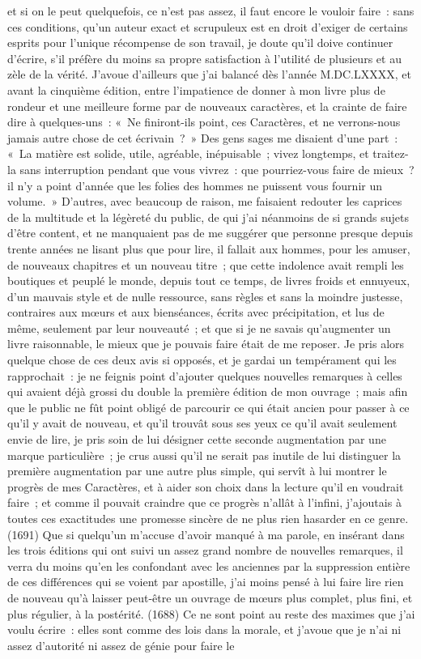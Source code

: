 \documentclass[french,twoside]{book} %
\newcommand{\ed}[1]{ {\color{silver}\sffamily\footnotesize (#1)} } %
\begin{document}
et si on le peut quelquefois, ce n’est pas assez, il faut encore le vouloir faire : sans ces conditions, qu’un auteur exact et scrupuleux est en droit d’exiger de certains esprits pour l’unique récompense de son travail, je doute qu’il doive continuer d’écrire, s’il préfère du moins sa propre satisfaction à l’utilité de plusieurs et au zèle de la vérité. J'avoue d’ailleurs que j’ai balancé dès l’année M.DC.LXXXX, et avant la cinquième édition, entre l’impatience de donner à mon livre plus de rondeur et une meilleure forme par de nouveaux caractères, et la crainte de faire dire à quelques-uns : « Ne finiront-ils point, ces Caractères, et ne verrons-nous jamais autre chose de cet écrivain ? » Des gens sages me disaient d’une part : « La matière est solide, utile, agréable, inépuisable ; vivez longtemps, et traitez-la sans interruption pendant que vous vivrez : que pourriez-vous faire de mieux ? il n’y a point d’année que les folies des hommes ne puissent vous fournir un volume. » D'autres, avec beaucoup de raison, me faisaient redouter les caprices de la multitude et la légèreté du public, de qui j’ai néanmoins de si grands sujets d’être content, et ne manquaient pas de me suggérer que personne presque depuis trente années ne lisant plus que pour lire, il fallait aux hommes, pour les amuser, de nouveaux chapitres et un nouveau titre ; que cette indolence avait rempli les boutiques et peuplé le monde, depuis tout ce temps, de livres froids et ennuyeux, d’un mauvais style et de nulle ressource, sans règles et sans la moindre justesse, contraires aux mœurs et aux bienséances, écrits avec précipitation, et lus de même, seulement par leur nouveauté ; et que si je ne savais qu’augmenter un livre raisonnable, le mieux que je pouvais faire était de me reposer. Je pris alors quelque chose de ces deux avis si opposés, et je gardai un tempérament qui les rapprochait : je ne feignis point d’ajouter quelques nouvelles remarques à celles qui avaient déjà grossi du double la première édition de mon ouvrage ; mais afin que le public ne fût point obligé de parcourir ce qui était ancien pour passer à ce qu’il y avait de nouveau, et qu’il trouvât sous ses yeux ce qu’il avait seulement envie de lire, je pris soin de lui désigner cette seconde augmentation par une marque particulière ; je crus aussi qu’il ne serait pas inutile de lui distinguer la première augmentation par une autre plus simple, qui servît à lui montrer le progrès de mes Caractères, et à aider son choix dans la lecture qu’il en voudrait faire ; et comme il pouvait craindre que ce progrès n’allât à l’infini, j’ajoutais à toutes ces exactitudes une promesse sincère de ne plus rien hasarder en ce genre. \ed{1691}Que si quelqu’un m’accuse d’avoir manqué à ma parole, en insérant dans les trois éditions qui ont suivi un assez grand nombre de nouvelles remarques, il verra du moins qu’en les confondant avec les anciennes par la suppression entière de ces différences qui se voient par apostille, j’ai moins pensé à lui faire lire rien de nouveau qu’à laisser peut-être un ouvrage de mœurs plus complet, plus fini, et plus régulier, à la postérité. \ed{1688}Ce ne sont point au reste des maximes que j’ai voulu écrire : elles sont comme des lois dans la morale, et j’avoue que je n’ai ni assez d’autorité ni assez de génie pour faire le 
\end{document}
